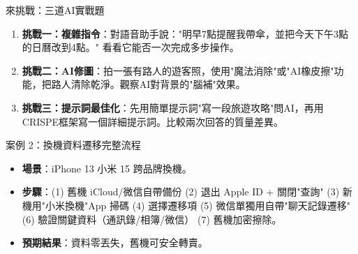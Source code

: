 \begin{tcbpractice}{來挑戰：三道AI實戰題}
\begin{enumerate}
  \item \textbf{挑戰一：複雜指令}：對語音助手說："明早7點提醒我帶傘，並把今天下午3點的日曆改到4點。" 看看它能否一次完成多步操作。
  \item \textbf{挑戰二：AI修圖}：拍一張有路人的遊客照，使用"魔法消除"或"AI橡皮擦"功能，把路人清除乾淨。觀察AI對背景的"腦補"效果。
  \item \textbf{挑戰三：提示詞最佳化}：先用簡單提示詞"寫一段旅遊攻略"問AI，再用CRISPE框架寫一個詳細提示詞。比較兩次回答的質量差異。
\end{enumerate}

\end{tcbpractice}

\begin{tcbinfo}{案例 2：換機資料遷移完整流程}
\begin{itemize}
  \item \textbf{場景}：iPhone 13 小米 15 跨品牌換機。
  \item \textbf{步驟}：(1) 舊機 iCloud/微信自帶備份 (2) 退出 Apple ID + 關閉"查詢" (3) 新機用"小米換機"App 掃碼 (4) 選擇遷移項 (5) 微信單獨用自帶"聊天記錄遷移" (6) 驗證關鍵資料（通訊錄/相簿/微信） (7) 舊機加密擦除。
  \item \textbf{預期結果}：資料零丟失，舊機可安全轉賣。
\end{itemize}

\end{tcbinfo}
